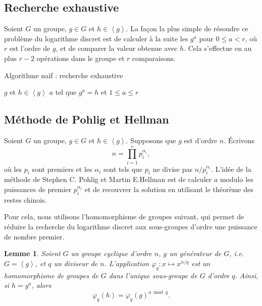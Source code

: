 \documentclass[a4paper, titlepage]{article}
\newtheorem{lemm}[theo]{Lemme}
\theoremstyle{definition}
\theoremstyle{remark}
\def\gen #1{\left\langle#1\right\rangle}
\begin{document}
\subsection{Recherche exhaustive}

Soient $G$ un groupe, $g\in G$ et $h \in \gen{g}$. La façon la plus simple de résoudre ce problème du logarithme discret est de calculer à la suite les $g^a$ pour $0 \leqslant a < r$, où $r$ est l'ordre de $g$, et de comparer la valeur obtenue avec $h$. Cela s'effectue en au plus $r - 2$ opérations dans le groupe et $r$ comparaisons.

\begin{algorithm}[h]
\caption{Algorithme naïf : recherche exhaustive}
\label{algoLogDiscretNaif}
\begin{algorithmic}[1]
\REQUIRE $g$ et $h \in \gen{g}$
\ENSURE $a$ tel que $g^a = h$ et $1 \leqslant a \leqslant r$
\ENDWHILE
{}
\end{algorithmic}
\end{algorithm}

\subsection{Méthode de Pohlig et Hellman}
\label{methodePohligHellman}
Soient $G$ un groupe, $g\in G$ et $h \in \gen{g}$. Supposons que $g$ est d'ordre $n$. \'Ecrivons $$n = \prod_{i=1}^r p_i^{\alpha_i},$$
où les $p_i$ sont premiers et les $\alpha_i$ sont tels que $p_i$ ne divise pas $n/p_i^{\alpha_i}$.
L'idée de la méthode de Stephen C. Pohlig et Martin E.Hellman \cite{pohligHellman1978} est de calculer $a$ modulo les puissances de premier $p_i^{\alpha_i}$ et de recouvrer la solution en utilisant le théorème des restes chinois.

Pour cela, nous utilisons l'homomorphisme de groupes suivant, qui permet de réduire la recherche du logarithme discret aux sous-groupes d'ordre une puissance de nombre premier.

\begin{lemm}
Soient $G$ un groupe cyclique d'ordre $n$, $g$ un générateur de $G$, i.e. $G = \gen{g}$, et $q$ un diviseur de $n$. L'application $\varphi_q : x \mapsto x^{n/q}$ est un homomorphisme de groupes de $G$ dans l'unique sous-groupe de $G$ d'ordre $q$. Ainsi, si $h = g^a$, alors $$\varphi_q(h) = \varphi_q(g)^{a \bmod{q}}.$$
\end{lemm}
\end{document}
